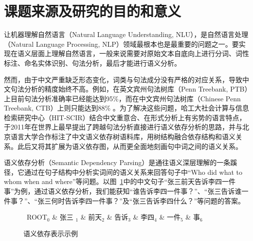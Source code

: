 \section{课题来源及研究的目的和意义}

让机器理解自然语言（Natural Language Understanding, NLU），是自然语言处理（Natural Language Processing, NLP）领域最根本也是最重要的问题之一。要实现在语义层面上理解自然语言，一般来说需要对原始文本自底向上进行分词、词性标注、命名实体识别、句法分析，最后才能进行语义分析。

然而，由于中文严重缺乏形态变化，词类与句法成分没有严格的对应关系，导致中文句法分析的精度始终不高。例如，在英文宾州句法树库（Penn Treebank, PTB）上目前句法分析准确率已经能达到95\%，而在中文宾州句法树库（Chinese Penn Treebank, CTB）上则只能达到88\% 。为了解决这些问题，哈工大社会计算与信息检索研究中心（HIT-SCIR）结合中文重意合、在形式分析上有劣势的语言特点，于2011年在世界上最早提出了跨越句法分析直接进行语义依存分析的思路，并与北京语言大学合作标注了中文语义依存树语料库，用树结构融合依存结构和语义关系。此后又将其扩展为语义依存图，从而更全面地刻画句中词之间的语义关系。

语义依存分析（Semantic Dependency Parsing）是通往语义深层理解的一条蹊径，它通过在句子结构中分析实词间的语义关系来回答句子中“Who did what to whom when and where”等问题。以图~\ref{fig:sdp0}中的中文句子“张三前天告诉李四一件事”为例，通过语义依存分析，我们能获知“谁告诉李四一件事？”、“张三告诉谁一件事？”、“张三何时告诉李四一件事？”及“张三告诉李四什么？”等问题的答案。

\begin{figure}[tb]
	\begin{center}
		\begin{small}
			\begin{dependency}[arc edge, arc angle=80, text only label, label style={above}]
				\begin{deptext} [row sep=0.4cm, column sep=.1cm]
					\ ROOT$_0$ \& 张三 $_1$ \& 前天$_2$ \& 告诉$_3$ \&  李四$_4$  \& 一件$_5$ \& 事$_6$ \\
				\end{deptext}
			\end{dependency}
			\caption{语义依存表示示例}\label{fig:sdp0}
		\end{small}
	\end{center}
\end{figure}

